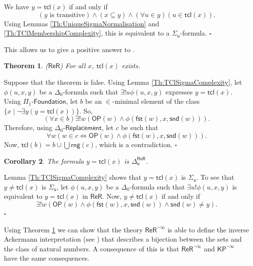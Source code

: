 \documentclass[11pt, a4paper]{article}
\newcounter{Theor1}
\newtheorem{theorem}{Theorem}[section]
\newtheorem{corollary}[theorem]{Corollary}
\newenvironment{proof}[1][Proof]{\begin{trivlist}
\item[\hskip \labelsep {\bfseries #1}]}{\end{trivlist}}
\begin{document}
\begin{proof}
We have $y = \mathsf{tcl}(x)$ if and only if 
\[
(y \textrm{ is transitive}) \land (x \subseteq y) \land (\forall u \in y)(u \in \mathsf{tcl}(x)).
\]
Using Lemmas \ref{Th:UniqueSigmaNormalisation} and \ref{Th:TClMembershipComplexity}, this is equivalent to a $\Sigma_{\mathsf{u}}$-formula. \hfill$\square$
\end{proof}

This allows us to give a positive answer to \cite[Problem 2.107]{mat06}.

\begin{theorem} \label{Th:TCoInReR}
($\mathsf{ReR}$) For all $x$, $\mathsf{tcl}(x)$ exists.
\end{theorem}

\begin{proof}
Suppose that the theorem is false. Using Lemma \ref{Th:TClSigmaComplexity}, let $\phi(u, x, y)$ be a $\Delta_0$-formula such that $\exists! u \phi(u, x, y)$ expresses $y= \mathsf{tcl}(x)$. Using $\Pi_1\textsf{-Foundation}$, let $b$ be an $\in$-minimal element of the class $\{ x \mid \neg \exists y(y= \mathsf{tcl}(x))\}$. So,
\[
(\forall x \in b)\exists! w (\mathsf{OP}(w) \land \phi(\mathsf{fst}(w), x, \mathsf{snd}(w))).
\]
Therefore, using $\Delta_0\textsf{-Replacement}$, let $c$ be such that 
\[
\forall w( w \in c \iff \mathsf{OP}(w) \land \phi(\mathsf{fst}(w), x, \mathsf{snd}(w))).
\]
Now, $\mathsf{tcl}(b)= b \cup \bigcup \mathsf{rng}(c)$, which is a contradiction. \hfill$\square$ 
\end{proof}

\begin{corollary} \label{Th:ComplexityOfTCl}
The formula $y= \mathsf{tcl}(x)$ is $\Delta_{\mathsf{u}}^{\mathsf{ReR}}$.
\end{corollary}

\begin{proof}
Lemma \ref{Th:TClSigmaComplexity} shows that $y= \mathsf{tcl}(x)$ is $\Sigma_{\mathsf{u}}$. To see that $y \neq \mathsf{tcl}(x)$ is $\Sigma_{\mathsf{u}}$, let $\phi(u, x, y)$ be a $\Delta_0$-formula such that $\exists u! \phi(u, x, y)$ is equivalent to $y= \mathsf{tcl}(x)$ in $\mathsf{ReR}$. Now, $y \neq \mathsf{tcl}(x)$ if and only if
\[
\exists! w(\mathsf{OP}(w) \land \phi(\mathsf{fst}(w), x, \mathsf{snd}(w)) \land \mathsf{snd}(w) \neq y).
\] 
\hfill$\square$
\end{proof}

Using Theorem \ref{Th:TCoInReR} we can show that the theory $\mathsf{ReR}^{\neg \infty}$ is able to define the inverse Ackermann interpretation (see \cite[\S 6]{kw07}) that describes a bijection between the sets and the class of natural numbers. A consequence of this is that $\mathsf{ReR}^{\neg \infty}$ and $\mathsf{KP}^{\neg \infty}$ have the same consequences. 
\end{document}
